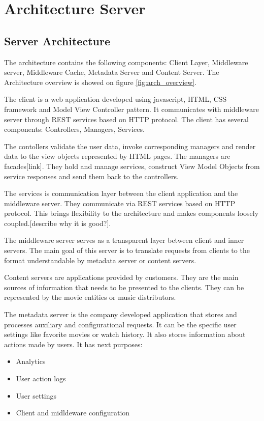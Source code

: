 \section{Architecture Server}

\subsection{Server Architecture}

The architecture contains the following components: Client Layer, Middleware server, Middleware Cache, Metadata Server and Content Server. The Architecture overview is showed on figure \ref{fig:arch_overview}. 

The client is a web application developed using javascript, HTML, CSS framework and Model View Controller pattern. It communicates with middleware server through REST services based on HTTP protocol. The client has several components: Controllers, Managers, Services. 

The contollers validate the user data, invoke corresponding managers and render data to the view objects represented by HTML pages. The managers are facades[link]. They hold and manage services, construct View Model Objects from service responses and send them back to the controllers. 

The services is communication layer between the client application and the middleware server. They communicate via REST services based on HTTP protocol. This brings flexibility to the architecture and makes components loosely coupled.[describe why it is good?]. 

The middleware server serves as a transparent layer between client and inner servers. The main goal of this server is to translate requests from clients to the format understandable by metadata server or content servers.  

Content servers are applications provided by customers. They are the main sources of information that needs to be presented to the clients. They can be represented by the movie entities or music distributors.

The metadata server is the company developed application that stores and processes auxiliary and configurational requests. It can be the specific user settings like favorite movies or watch history. It also stores information about actions made by users. It has next purposes:

\begin{itemize}
	\item Analytics
	\item User action logs
	\item User settings
	\item Client and midldeware configuration
\end{itemize} 

